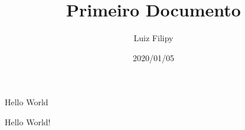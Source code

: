 \documentclass{article}
\title{Primeiro Documento}
\date{2020/01/05}
\author{Luiz Filipy}
\begin{document}
  \maketitle
  
  \newpage
  Hello World

  \newpage
  Hello World!
\end{document}
